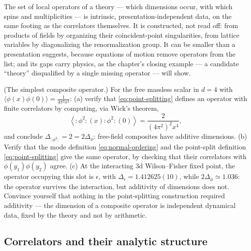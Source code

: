 \begin{iidea}
\label{idea:operator-content}
The set of local operators of a theory --- which dimensions occur, with which
spins and multiplicities --- is intrinsic, presentation-independent data, on
the same footing as the correlators themselves. It is constructed, not read
off: from products of fields by organizing their coincident-point
singularities, from lattice variables by diagonalizing the renormalization
group. It can be smaller than a presentation suggests, because equations of
motion remove operators from the list; and its gaps carry physics, as the
chapter's closing example --- a candidate ``theory'' disqualified by a single
missing operator --- will show.
\end{iidea}

\begin{exercise}[classic]
\label{exr:point-splitting}
(The simplest composite operator.) For the free massless scalar in $d=4$ with
$\langle\phi(x)\phi(0)\rangle = \frac{1}{4\pi^2 x^2}$: (a) verify that
\eqref{eq:point-splitting} defines an operator with finite correlators by
computing, via Wick's theorem,
\begin{equation*}
\left\langle {:}\phi^2{:}(x) {:}\phi^2{:}(0) \right\rangle
= \frac{2}{(4\pi^2)^2 x^4},
\end{equation*}
and conclude $\Delta_{:\phi^2:} = 2 = 2\Delta_\phi$: free-field composites
have additive dimensions. (b) Verify that the mode definition
\eqref{eq:normal-ordering} and the point-split definition
\eqref{eq:point-splitting} give the same operator, by checking that their
correlators with $\phi(y_1)\phi(y_2)$ agree. (c) At the interacting 3d
Wilson--Fisher fixed point, the operator occupying this slot is $\epsilon$,
with $\Delta_\epsilon = 1.412625(10)$, while $2\Delta_\phi \simeq 1.036$:
the operator survives the interaction, but additivity of dimensions does
not. Convince yourself that nothing in the point-splitting construction
required additivity --- the dimension of a composite operator is independent
dynamical data, fixed by the theory and not by arithmetic.
\end{exercise}

\subsection{Correlators and their analytic structure}
\label{sec:analytic-structure}

